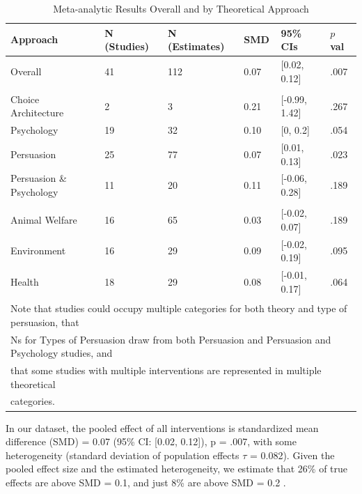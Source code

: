 \documentclass[preprint, 3p,
authoryear]{elsarticle} %
\begin{document}
\begin{table}[!h]
\centering
\caption{\label{tab:table_one}Meta-analytic Results Overall and by Theoretical Approach}
\centering
\begin{tabular}[t]{llllll}
\toprule
Approach & N (Studies) & N (Estimates) & SMD & 95\% CIs & $p$ val\\
\midrule
Overall & 41 & 112 & 0.07 & {}[0.02, 0.12] & .007\\
\addlinespace[0.5em]
\multicolumn{6}{l}{\textbf{Theory}}\\
\hspace{1em}Choice Architecture & 2 & 3 & 0.21 & {}[-0.99, 1.42] & .267\\
\hspace{1em}Psychology & 19 & 32 & 0.10 & {}[0, 0.2] & .054\\
\hspace{1em}Persuasion & 25 & 77 & 0.07 & {}[0.01, 0.13] & .023\\
\hspace{1em}Persuasion \& Psychology & 11 & 20 & 0.11 & {}[-0.06, 0.28] & .189\\
\addlinespace[0.5em]
\multicolumn{6}{l}{\textbf{Type of Persuasion}}\\
\hspace{1em}Animal Welfare & 16 & 65 & 0.03 & {}[-0.02, 0.07] & .189\\
\hspace{1em}Environment & 16 & 29 & 0.09 & {}[-0.02, 0.19] & .095\\
\hspace{1em}Health & 18 & 29 & 0.08 & {}[-0.01, 0.17] & .064\\
\bottomrule
\multicolumn{6}{l}{\textsuperscript{} Note that studies could occupy multiple categories for both theory and type of persuasion, that}\\
\multicolumn{6}{l}{Ns for Types of Persuasion draw from both Persuasion and Persuasion and Psychology studies, and}\\
\multicolumn{6}{l}{that some studies with multiple interventions are represented in multiple theoretical}\\
\multicolumn{6}{l}{categories.}\\
\end{tabular}
\end{table}

In our dataset, the pooled effect of all interventions is standardized
mean difference (SMD) = 0.07 (95\% CI: {[}0.02, 0.12{]}), p = .007, with
some heterogeneity (standard deviation of population effects \(\tau\) =
0.082). Given the pooled effect size and the estimated heterogeneity, we
estimate that 26\% of true effects are above SMD = 0.1, and just 8\% are
above SMD = 0.2 \citep{mathur2019, mathur2020robust}.
\end{document}
